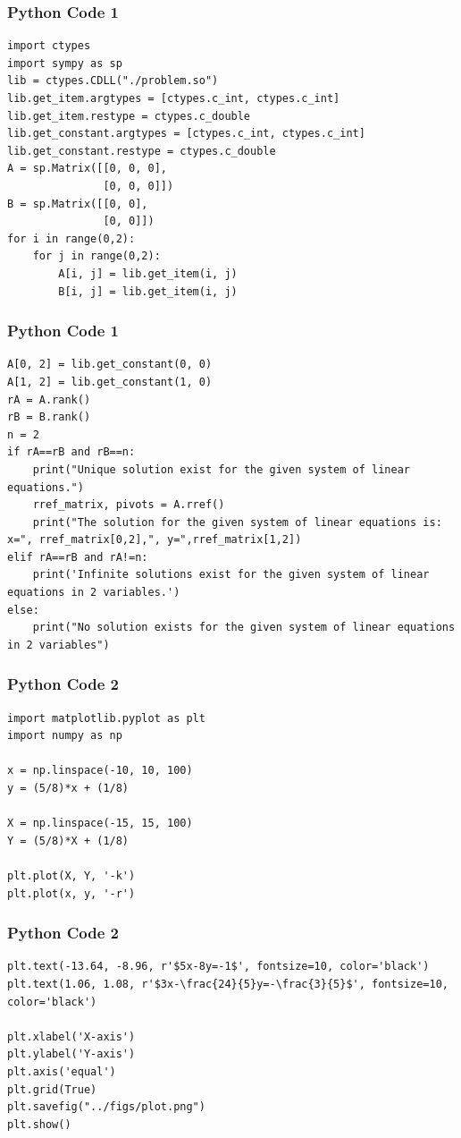 \documentclass{beamer}
\begin{document}
\begin{frame}[fragile]
    \frametitle{Python Code 1}
    \begin{lstlisting}
import ctypes
import sympy as sp
lib = ctypes.CDLL("./problem.so")
lib.get_item.argtypes = [ctypes.c_int, ctypes.c_int]
lib.get_item.restype = ctypes.c_double
lib.get_constant.argtypes = [ctypes.c_int, ctypes.c_int]
lib.get_constant.restype = ctypes.c_double
A = sp.Matrix([[0, 0, 0],
               [0, 0, 0]])
B = sp.Matrix([[0, 0],
               [0, 0]])
for i in range(0,2):
    for j in range(0,2):
        A[i, j] = lib.get_item(i, j)
        B[i, j] = lib.get_item(i, j)
    \end{lstlisting}
\end{frame}

\begin{frame}[fragile]
    \frametitle{Python Code 1}
    \begin{lstlisting}
A[0, 2] = lib.get_constant(0, 0)
A[1, 2] = lib.get_constant(1, 0)
rA = A.rank()
rB = B.rank()
n = 2
if rA==rB and rB==n:
    print("Unique solution exist for the given system of linear equations.")
    rref_matrix, pivots = A.rref()
    print("The solution for the given system of linear equations is: x=", rref_matrix[0,2],", y=",rref_matrix[1,2])
elif rA==rB and rA!=n:
    print('Infinite solutions exist for the given system of linear equations in 2 variables.')
else:
    print("No solution exists for the given system of linear equations in 2 variables")
    \end{lstlisting}
\end{frame}

\begin{frame}[fragile]
    \frametitle{Python Code 2}
    \begin{lstlisting}
import matplotlib.pyplot as plt
import numpy as np

x = np.linspace(-10, 10, 100)
y = (5/8)*x + (1/8)

X = np.linspace(-15, 15, 100)
Y = (5/8)*X + (1/8)

plt.plot(X, Y, '-k')
plt.plot(x, y, '-r')
    \end{lstlisting}
\end{frame}

\begin{frame}[fragile]
    \frametitle{Python Code 2}
    \begin{lstlisting}
plt.text(-13.64, -8.96, r'$5x-8y=-1$', fontsize=10, color='black')
plt.text(1.06, 1.08, r'$3x-\frac{24}{5}y=-\frac{3}{5}$', fontsize=10, color='black')

plt.xlabel('X-axis')
plt.ylabel('Y-axis')
plt.axis('equal')
plt.grid(True)
plt.savefig("../figs/plot.png")
plt.show()   \end{lstlisting}
\end{frame}
\end{document}
